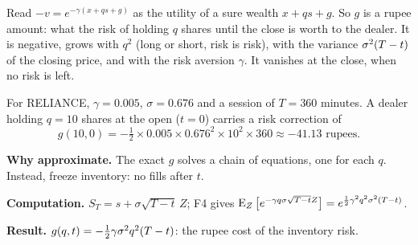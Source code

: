 \begin{intuition}
Read $-v=e^{-\gamma(x+qs+g)}$ as the utility of a sure wealth $x+qs+g$. So $g$ is a rupee amount: what the risk of holding $q$ shares until the close is worth to the dealer. It is negative, grows with $q^2$ (long or short, risk is risk), with the variance $\sigma^2(T-t)$ of the closing price, and with the risk aversion $\gamma$. It vanishes at the close, when no risk is left.
\end{intuition}

\begin{example}
For RELIANCE, $\gamma=0.005$, $\sigma=0.676$ and a session of $T=360$ minutes. A dealer holding $q=10$ shares at the open ($t=0$) carries a risk correction of
\[
  g(10,0)=-\tfrac12\times0.005\times0.676^2\times10^2\times360\approx-41.13\text{ rupees}.
\]
\end{example}

\begin{recall}
\textbf{Why approximate.} The exact $g$ solves a chain of equations, one for each $q$. Instead, freeze inventory: no fills after $t$.

\textbf{Computation.} $S_T=s+\sigma\sqrt{T-t}\,Z$; F4 gives $\operatorname{E}_Z\big[e^{-\gamma q\sigma\sqrt{T-t}Z}\big]=e^{\frac12\gamma^2q^2\sigma^2(T-t)}$.

\textbf{Result.} $g(q,t)=-\tfrac12\gamma\sigma^2q^2(T-t)$: the rupee cost of the inventory risk.
\end{recall}
